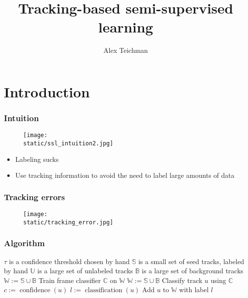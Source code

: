 \documentclass{beamer}
\title{Tracking-based semi-supervised learning}
\author{Alex Teichman}
\institute{Stanford University}
\renewcommand{\S}{\mathbb{S}}
\newcommand{\U}{\mathbb{U}}
\newcommand{\B}{\mathbb{B}}
\newcommand{\W}{\mathbb{W}}
\newcommand{\C}{\mathbb{C}}
\newcommand{\static}{../latex/static_img}
\begin{document}
\begin{frame}
\titlepage
\end{frame}

\section{Introduction}


\begin{frame}
  \frametitle{Intuition}
  \begin{figure}
    \centering
    \texttt{[image: \\static/ssl\_intuition2.jpg]}
    \label{fig:ssl_intuition}
  \end{figure}
  
  \begin{itemize}
  \item Labeling sucks
  \item Use tracking information to avoid the need to label large amounts of data
  \end{itemize}
\end{frame}


\begin{frame}
  \frametitle{Tracking errors}
  \begin{figure}
    \centering
    \texttt{[image: \\static/tracking\_error.jpg]}
    \label{fig:tracking_error}
  \end{figure}
\end{frame}

\begin{frame}
  \frametitle{Algorithm}
  \begin{algorithm}[H]
    
    \label{alg:ssl}
    \begin{algorithmic}
      \tiny{
      \STATE $\tau$ is a confidence threshold chosen by hand
      \STATE $\S$ is a small set of seed tracks, labeled by hand
      \STATE $\U$ is a large set of unlabeled tracks
      \STATE $\B$ is a large set of background tracks
      \STATE $\W := \S \cup \B$
      \STATE
      \REPEAT
      \STATE Train frame classifier $\C$ on $\W$
      \STATE $\W := \S \cup \B$
      \FOR{$u \in \U$}
      \STATE Classify track $u$ using $\C$
      \STATE $c := \operatorname{confidence}(u)$
      \STATE $l := \operatorname{classification}(u)$
      \STATE Add $u$ to $\W$ with label $l$
      \ENDIF
      \ENDFOR
      }
    \end{algorithmic}
  \end{algorithm}
\end{frame}
\end{document}
